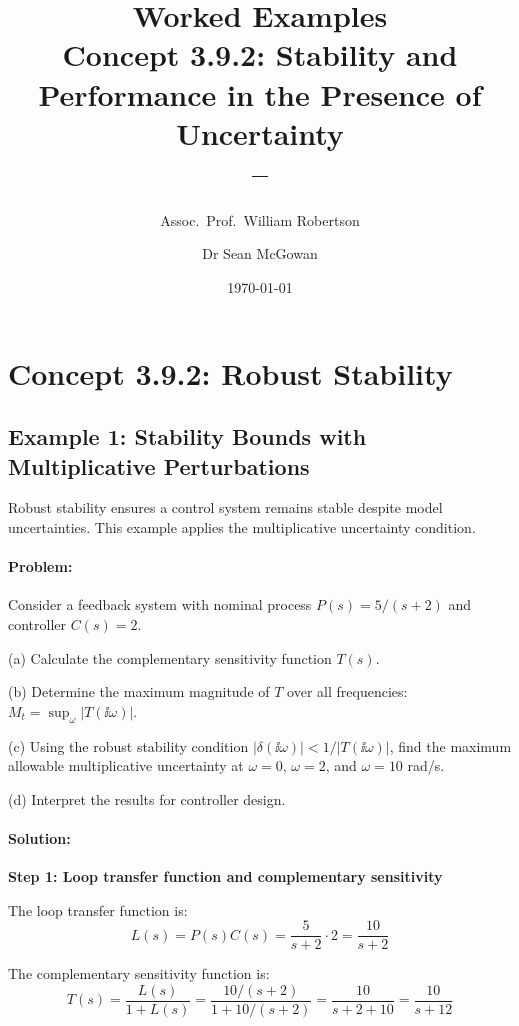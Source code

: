 \documentclass[11pt,a4paper]{article}
\title{\textbf{Worked Examples}\\[0.5em]
\large Concept 3.9.2: Stability and Performance in the Presence of Uncertainty\\[0.3em]
\normalsize \coursesubtitle{} -- \coursetitle}
\author{Assoc.\ Prof.\ William Robertson \and Dr Sean McGowan}
\date{\today}
\begin{document}
\maketitle
\tableofcontents
\newpage

\section{Concept 3.9.2: Robust Stability}

\subsection{Example 1: Stability Bounds with Multiplicative Perturbations}

Robust stability ensures a control system remains stable despite model uncertainties. This example applies the multiplicative uncertainty condition.

\paragraph{Problem:}
Consider a feedback system with nominal process $P(s) = 5/(s+2)$ and controller $C(s) = 2$.

(a) Calculate the complementary sensitivity function $T(s)$.

(b) Determine the maximum magnitude of $T$ over all frequencies: $M_t = \sup_\omega |T(\ii\omega)|$.

(c) Using the robust stability condition $|\delta(\ii\omega)| < 1/|T(\ii\omega)|$, find the maximum allowable multiplicative uncertainty at $\omega = 0$, $\omega = 2$, and $\omega = 10$ rad/s.

(d) Interpret the results for controller design.

\paragraph{Solution:}

\textbf{Step 1: Loop transfer function and complementary sensitivity}

The loop transfer function is:
\begin{equation}
  L(s) = P(s)C(s) = \frac{5}{s+2} \cdot 2 = \frac{10}{s+2}
\end{equation}

The complementary sensitivity function is:
\begin{equation}
  T(s) = \frac{L(s)}{1 + L(s)} = \frac{10/(s+2)}{1 + 10/(s+2)} = \frac{10}{s+2+10} = \frac{10}{s+12}
\end{equation}
\end{document}
